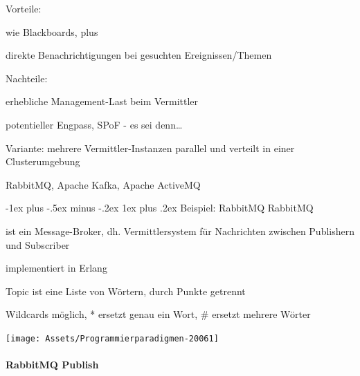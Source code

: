 \documentclass[10pt]{article}
\makeatletter
\renewcommand{\subsubsection}{\@startsection{subsubsection}{3}{0mm}%
                                {-1ex plus -.5ex minus -.2ex}%
                                {1ex plus .2ex}%
                                {\normalfont\small\bfseries}}
\makeatother
\begin{document}
\begin{itemize*}
  \item Vorteile:
  \begin{itemize*}
    \item wie Blackboards, plus
    \item direkte Benachrichtigungen bei gesuchten Ereignissen/Themen
  \end{itemize*}
  \item Nachteile:
  \begin{itemize*}
    \item erhebliche Management-Last beim Vermittler
    \begin{itemize*}
      \item potentieller Engpass, SPoF - es sei denn…
    \end{itemize*}
  \end{itemize*}
  Variante: mehrere Vermittler-Instanzen parallel und verteilt in einer Clusterumgebung
  \begin{itemize*}
    \item RabbitMQ, Apache Kafka, Apache ActiveMQ
  \end{itemize*}
\end{itemize*}

\subsubsection{Beispiel: RabbitMQ}
RabbitMQ
\begin{itemize*}
  \item ist ein Message-Broker, dh. Vermittlersystem für Nachrichten zwischen Publishern und Subscriber
  \item implementiert in Erlang
  \begin{itemize*}
    \item Topic ist eine Liste von Wörtern, durch Punkte getrennt
    \item Wildcards möglich, * ersetzt genau ein Wort, \# ersetzt mehrere Wörter
  \end{itemize*}
\end{itemize*}
\begin{center}
  \centering
  \texttt{[image: Assets/Programmierparadigmen-20061]}
\end{center}

\paragraph{RabbitMQ Publish}
\end{document}
